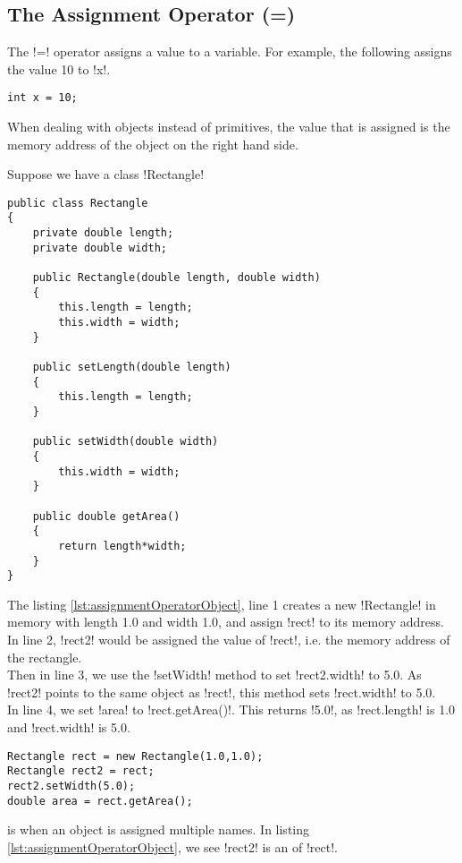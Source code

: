 \documentclass[11pt]{article}
\begin{document}
\subsection{The Assignment Operator (=)}
The \inlineJava!=! operator assigns a value to a variable. For example, the following assigns the value 10 to \inlineJava!x!.
\vspace{-15pt}
\begin{lstlisting}
int x = 10;
\end{lstlisting}
When dealing with objects instead of primitives, the value that is assigned is the memory address of the object on the right hand side.
\begin{eg} Suppose we have a class \inlineJava!Rectangle!
\begin{lstlisting}[caption=Rectangle, label=lst:Rectangle]
public class Rectangle
{
    private double length;
    private double width;

    public Rectangle(double length, double width)
    {
        this.length = length;
        this.width = width;
    }

    public setLength(double length)
    {
        this.length = length;
    }

    public setWidth(double width)
    {
        this.width = width;
    }
    
    public double getArea()
    {
        return length*width;
    }
}
\end{lstlisting}
\pagebreak
The listing \ref{lst:assignmentOperatorObject}, line 1 creates a new \inlineJava!Rectangle! in memory with length 1.0 and width 1.0, and assign \inlineJava!rect! to its memory address.
\\ In line 2, \inlineJava!rect2! would be assigned the value of \inlineJava!rect!, i.e. the memory address of the rectangle.
\\ Then in line 3, we use the \inlineJava!setWidth! method to set \inlineJava!rect2.width! to 5.0. As \inlineJava!rect2! points to the same object as \inlineJava!rect!, this method sets \inlineJava!rect.width! to 5.0.
\\ In line 4, we set \inlineJava!area! to \inlineJava!rect.getArea()!. This returns \inlineJava!5.0!, as \inlineJava!rect.length! is 1.0 and \inlineJava!rect.width! is 5.0.
\begin{lstlisting}[caption=A sample of code to interact with the Rectangle class, label=lst:assignmentOperatorObject] 
Rectangle rect = new Rectangle(1.0,1.0);
Rectangle rect2 = rect;
rect2.setWidth(5.0);
double area = rect.getArea();
\end{lstlisting}
\end{eg}
\begin{defi}[Aliasing]
 is when an object is assigned multiple names. In listing \ref{lst:assignmentOperatorObject}, we see \inlineJava!rect2! is an  of \inlineJava!rect!.
\end{defi}
\end{document}
